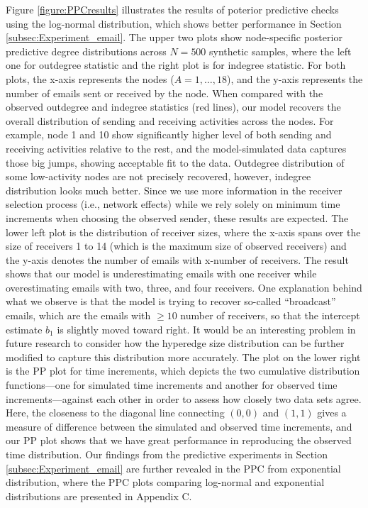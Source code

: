 \documentclass[ba]{imsart}
\numberwithin{equation}{section}
\theoremstyle{plain}
\begin{document}
	Figure \ref{figure:PPCresults} illustrates the results of poterior predictive checks using the log-normal distribution, which shows better performance in Section \ref{subsec:Experiment_email}. The upper two plots show node-specific posterior predictive degree distributions across $N=500$ synthetic samples, where the left one for outdegree statistic and the right plot is for indegree statistic. For both plots, the x-axis represents the nodes ($A=1,\ldots,18$), and the y-axis represents the number of emails sent or received by the node. When compared with the observed outdegree and indegree statistics (red lines), our model recovers the overall distribution of sending and receiving activities across the nodes. For example, node 1 and 10 show significantly higher level of both sending and receiving activities relative to the rest, and the model-simulated data captures those big jumps, showing acceptable fit to the data. Outdegree distribution of some low-activity nodes are not precisely recovered, however, indegree distribution looks much better. Since we use more information in the receiver selection process (i.e., network effects) while we rely solely on minimum time increments when choosing the observed sender, these results are expected. The lower left plot is the distribution of receiver sizes, where the x-axis spans over the size of receivers 1 to 14 (which is the maximum size of observed receivers) and the y-axis denotes the number of emails with x-number of receivers. The result shows that our model is underestimating emails with one receiver while overestimating emails with two, three, and four receivers. One explanation behind what we observe is that the model is trying to recover so-called ``broadcast'' emails, which are the emails with $\geq 10$ number of receivers, so that the intercept estimate $b_1$ is slightly moved toward right. It would be an interesting problem in future research to consider how the hyperedge size distribution can be further modified to capture this distribution more accurately. The plot on the lower right is the PP plot for time increments, which depicts the two cumulative distribution functions---one for simulated time increments and another for observed time increments---against each other in order to assess how closely two data sets agree. Here, the closeness to the diagonal line connecting $(0, 0)$ and $(1, 1)$ gives a measure of difference between the simulated and observed time increments, and our PP plot shows that we have great performance in reproducing the observed time distribution. Our findings from the predictive experiments in Section \ref{subsec:Experiment_email} are further revealed in the PPC from exponential distribution, where the PPC plots comparing log-normal and exponential distributions are presented in Appendix C.
	
\end{document}
